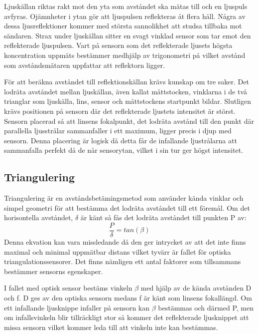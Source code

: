 \documentclass[a4paper,12pt,fleqn]{article}
\begin{document}
Ljuskällan riktas rakt mot den yta som avståndet ska mätas till och en ljuspuls avfyras. Ojämnheter i ytan gör att ljuspulsen reflekteras åt flera håll. Några av dessa ljusreflektioner kommer med största sannolikhet att studsa tillbaka mot sändaren.
Strax under ljuskällan sitter en svagt vinklad sensor som tar emot den reflekterade ljuspulsen.  Vart på sensorn som det reflekterade ljusets högsta koncentration uppmäts bestämmer medhjälp av trigonometri på vilket avstånd som avståndsmätaren uppfattar att reflektorn ligger.


För att beräkna avståndet till reflektionskällan krävs kunskap om tre saker.
Det lodräta avståndet mellan ljuskällan, även kallat måttstocken, vinklarna i de två trianglar som ljuskälla, lins, sensor och måttstockens startpunkt bildar. Slutligen krävs positionen på sensorn där det reflekterade ljustets intensitet är störst. Sensorn placerad så att linsens fokalpunkt, det lodräta avstånd till den punkt där parallella ljusstrålar sammanfaller i ett maximum, ligger precis i djup med sensorn. Denna placering är logisk då detta får de infallande ljustrålarna att sammanfalla perfekt då de når sensorytan, vilket i sin tur ger högst intensitet.

\subsection{Triangulering}
Triangulering är en avståndsbetämingsmetod som använder kända vinklar och simpel geometri för att bestämma det lodräta avståndet till ett föremål.
Om det horisontella avståndet, \begin{math}\delta\end{math} är känt så fås det lodräta avståndet till punkten P av:
\begin{equation}
\label{eq:angle}
\frac{P}{\delta}=tan(\beta)
\end{equation}
Denna ekvation kan vara missledande då den ger intrycket av att det inte finns maximal och minimal uppmätbar distans vilket tyvärr är fallet för optiska triangulationssensorer.
Det finns nämligen ett antal faktorer som tillsammans bestämmer sensorns egenskaper.

I fallet med optisk sensor bestäms vinkeln \begin{math}\beta\end{math} med hjälp av de kända avstånden D och f. D ges av den optiska sensorn medans f är känt som linsens fokallängd. Om ett infallande ljusknippe infaller på sensorn kan \begin{math}\beta\end{math} bestämmas och därmed P, men om  infallsvinkeln blir tillräckligt stor så kommer det reflekterade ljusknippet att missa sensorn vilket kommer leda till att vinkeln inte kan bestämmas.
\end{document}
